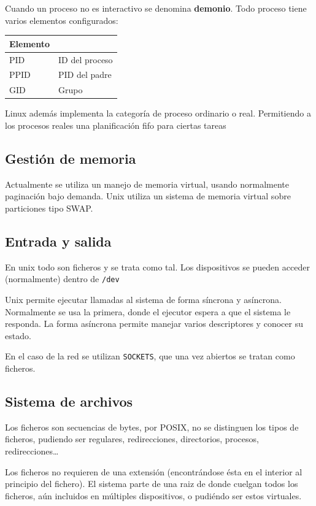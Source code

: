     Cuando un proceso no es interactivo se denomina \textbf{demonio}. Todo proceso tiene varios elementos configurados:
    \begin{table}[H]
    \begin{tabular}{ll}
        Elemento &  \\
        \midrule
        PID & ID del proceso \\
        PPID & PID del padre\\
        GID & Grupo \\
    \end{tabular}
    \end{table}

    Linux además implementa la categoría de proceso ordinario o real. Permitiendo a los procesos reales una planificación fifo para ciertas tareas

\subsection{Gestión de memoria}
    Actualmente se utiliza un manejo de memoria virtual, usando normalmente paginación bajo demanda. Unix utiliza un sistema de memoria virtual sobre particiones tipo SWAP.

\subsection{Entrada y salida}
    En unix todo son ficheros y se trata como tal. Los dispositivos se pueden acceder (normalmente) dentro de \texttt{/dev}

    Unix permite ejecutar llamadas al sistema de forma síncrona y asíncrona. Normalmente se usa la primera, donde el ejecutor espera a que el sistema le responda. La forma asíncrona permite manejar varios descriptores y conocer su estado.

    En el caso de la red se utilizan \texttt{SOCKETS}, que una vez abiertos se tratan como ficheros.

\subsection{Sistema de archivos}
    Los ficheros son secuencias de bytes, por POSIX, no se distinguen los tipos de ficheros, pudiendo ser regulares, redirecciones, directorios, procesos, redirecciones\dots

    Los ficheros no requieren de una extensión (encontrándose ésta en el interior al principio del fichero). El sistema parte de una raiz de donde cuelgan todos los ficheros, aún incluidos en múltiples dispositivos, o pudiéndo ser estos virtuales.

